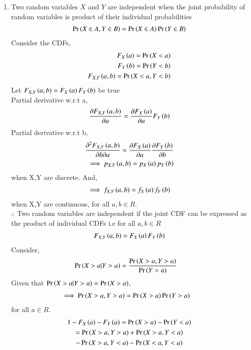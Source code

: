 \documentclass[journal,12pt,twocolumn]{IEEEtran}
\begin{document}
\begin{enumerate}
    \item Two random variables $X$ and $Y$ are independent when the joint probability of random variables is product of their individual probabilities
    \begin{align}
        \label{eq1} \Pr\left(X\in A,Y \in B\right)=\Pr\left(X \in A\right)\Pr\left(Y \in B\right)
    \end{align}
    Consider the CDFs,
    \begin{align}
        F_X\left(a\right)=\Pr\left(X<a\right)\\
        F_Y\left(b\right)=\Pr\left(Y<b\right)\\
        F_{X,Y}\left(a,b\right)=\Pr\left(X<a,Y<b\right)
    \end{align}
    Let $F_{X,Y}\left(a,b\right)=F_X\left(a\right)F_Y\left(b\right)$ be true\\
    Partial derivative w.r.t a,
    \begin{align}
        \frac{\partial F_{X,Y}\left(a,b\right)}{\partial a}=\frac{\partial F_X\left(a\right) }{\partial a}F_Y\left(b\right)
    \end{align}
    Partial derivative w.r.t b,
    \begin{align}
        \frac{\partial^2 F_{X,Y}\left(a,b\right)}{\partial b \partial a}=\frac{\partial F_X\left(a\right) }{\partial a}\frac{\partial F_Y\left(b\right) }{\partial b} \\
        \implies p_{X,Y}\left(a,b\right)=p_X\left(a\right)p_Y\left(b\right)
    \end{align}
    when X,Y are discrete. And,
    \begin{align}
        \implies f_{X,Y}\left(a,b\right)=f_X\left(a\right)f_Y\left(b\right)
    \end{align}
    when X,Y are continuous, for all $a,b\in R$. \\
    $\therefore$ Two random variables are independent if the joint CDF can be expressed as the product of individual CDFs i.e for all $a,b\in R$
    \begin{align}
       \label{eq1} F_{X,Y}\left(a,b\right)=F_X\left(a\right)F_Y\left(b\right)
    \end{align}
    Consider,
    \begin{align}
      \Pr\left(X>a|Y>a\right)&=\frac{\Pr\left(X>a,Y>a\right)}{\Pr\left(Y>a\right)}
    \end{align}
    Given that $\Pr\left(X>a|Y>a\right)=\Pr\left(X>a\right)$,
    \begin{align}
        \implies \Pr\left(X>a,Y>a\right)&=\Pr\left(X>a\right)\Pr\left(Y>a\right)
    \end{align}
    for all $a\in R$.
    \begin{multline}
        1-F_X\brak{a}-F_Y\brak{a}=\pr{X>a}-\pr{Y<a}\\=\pr{X>a,Y>a}+\pr{X>a,Y<a}\\-\pr{X>a,Y<a}-\pr{X<a,Y<a}

\end{multline}
\end{enumerate}
\end{document}
